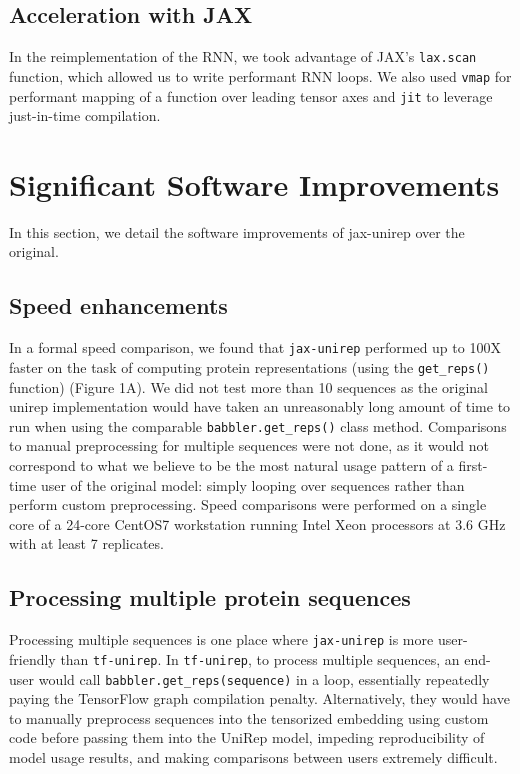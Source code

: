 \documentclass[twoside,11pt]{article}
\begin{document}
\subsection{Acceleration with JAX}

In the reimplementation of the RNN,
we took advantage of JAX's \verb|lax.scan| function,
which allowed us to write performant RNN loops.
We also used \verb|vmap| for performant mapping of a function
over leading tensor axes
and \verb|jit| to leverage just-in-time compilation.

\section{Significant Software Improvements}

In this section,
we detail the software improvements of jax-unirep over the original.

\subsection{Speed enhancements}

In a formal speed comparison, we found that \verb|jax-unirep|
performed up to 100X faster on the task of computing protein representations
(using the \verb|get_reps()| function) (Figure 1A\vphantom{\ref{fig:01}}).
We did not test more than 10 sequences
as the original unirep implementation would have taken
an unreasonably long amount of time to run
when using the comparable \verb|babbler.get_reps()| class method.
Comparisons to manual preprocessing for multiple sequences were not done,
as it would not correspond to what we believe to be
the most natural usage pattern of a first-time user of the original model:
simply looping over sequences rather than perform custom preprocessing.
Speed comparisons were performed on a single core of a 24-core
CentOS7 workstation running Intel Xeon processors at 3.6 GHz
with at least 7 replicates.

\subsection{Processing multiple protein sequences}

Processing multiple sequences is one place where \verb|jax-unirep|
is more user-friendly than \verb|tf-unirep|.
In \verb|tf-unirep|, to process multiple sequences,
an end-user would call \verb|babbler.get_reps(sequence)| in a loop,
essentially repeatedly paying the TensorFlow graph compilation penalty.
Alternatively, they would have to manually preprocess sequences
into the tensorized embedding using custom code
before passing them into the UniRep model,
impeding reproducibility of model usage results,
and making comparisons between users extremely difficult.
\end{document}
